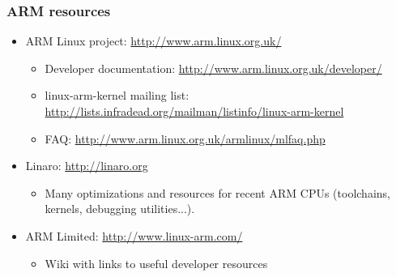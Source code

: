 \begin{frame}
  \frametitle{ARM resources}
  \begin{itemize}
  \item ARM Linux project: \url{http://www.arm.linux.org.uk/}
    \begin{itemize}
    \item Developer documentation:
      \url{http://www.arm.linux.org.uk/developer/}
    \item linux-arm-kernel mailing list:
      \url{http://lists.infradead.org/mailman/listinfo/linux-arm-kernel}
    \item FAQ: \url{http://www.arm.linux.org.uk/armlinux/mlfaq.php}
    \end{itemize}
  \item Linaro: \url{http://linaro.org}
    \begin{itemize}
    \item Many optimizations and resources for recent ARM CPUs
      (toolchains, kernels, debugging utilities...).
    \end{itemize}
  \item ARM Limited: \url{http://www.linux-arm.com/}
    \begin{itemize}
    \item Wiki with links to useful developer resources
    \end{itemize}
  \end{itemize}
\end{frame}
